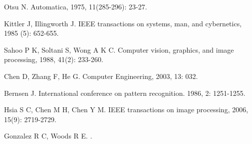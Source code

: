 \begin{thebibliography}{99} %
		
		Otsu N.  
		\newblock Automatica, 1975, 11(285-296): 23-27.
		
		Kittler J, Illingworth J. 
		\newblock IEEE transactions on systems, man, and cybernetics, 1985 (5): 652-655.
		
		Sahoo P K, Soltani S, Wong A K C. 
		\newblock Computer vision, graphics, and image processing, 1988, 41(2): 233-260.
		
		Chen D, Zhang F, He G. 
		\newblock Computer Engineering, 2003, 13: 032.
		
		Bernsen J.
		\newblock International conference on pattern recognition. 1986, 2: 1251-1255.
		
		Hsia S C, Chen M H, Chen Y M. 
		\newblock IEEE transactions on image processing, 2006, 15(9): 2719-2729.
		
		Gonzalez R C, Woods R E. 
		.
		
		
		\newblock {\em } 
		\newblock
		
		
		\newblock {\em } 
		\newblock   
\end{thebibliography}